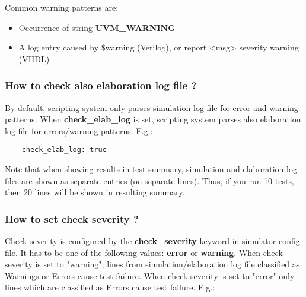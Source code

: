 \documentclass{tropic_design_spec}
\begin{document}
Common warning patterns are:
\begin{itemize}
    \item {Occurrence of string \textbf{UVM_WARNING}}
    \item {A log entry caused by \$warning (Verilog), or report <msg> severity warning (VHDL)}
\end{itemize}



\subsubsection{How to check also elaboration log file ?}
\label{sec:how-to-check-also-elaboration-log}

By default, scripting system only parses simulation log file for error and warning patterns.
When \textbf{check_elab_log} is set, scripting system parses also elaboration log file
for errors/warning patterns. E.g.:

\begin{lstlisting}
    check_elab_log: true
\end{lstlisting}

Note that when showing results in test summary, simulation and elaboration log files are
shown as separate entries (on separate lines). Thus, if you run 10 tests, then 20 lines
will be shown in resulting summary.


\subsubsection{How to set check severity ?}
\label{sec:how-to-set-check-severity}

Check severity is configured by the \textbf{check_severity} keyword in simulator config file.
It has to be one of the following values: \textbf{error} or \textbf{warning}. When check
severity is set to "warning", lines from simulation/elaboration log file classified as Warnings or
Errors cause test failure. When check severity is set to "error" only lines which are
classified as Errors cause test failure. E.g.:
\end{document}
